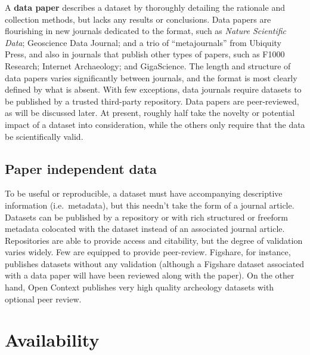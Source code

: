\documentclass[10pt,a4paper,twocolumn]{article}
\begin{document}
A \textbf{data paper} describes a dataset by thoroughly detailing the rationale and collection methods, but lacks any results or conclusions. 
Data papers are flourishing in new journals dedicated to the format, such as \emph{Nature Scientific Data}\cite{nature_scientific_data}; Geoscience Data Journal\cite{geoscience_data_journal}; and a trio of ``metajournals'' from Ubiquity Press\cite{ubiquity_press_metajournals}, and also in journals that publish other types of papers, such as F1000 Research\cite{f1000_research}; Internet Archaeology\cite{internet_archaeology}; and GigaScience\cite{gigascience}. 
The length and structure of data papers varies significantly between journals, and the format is most clearly defined by what is absent.
With few exceptions, data journals require datasets to be published by a trusted third-party repository. 
Data papers are peer-reviewed, as will be discussed later.  At present, roughly half take the novelty or potential impact of a dataset into consideration, while the others only require that the data be scientifically valid.

\subsection*{Paper independent data}\label{paper-independent-data}

To be useful or reproducible, a dataset must have accompanying descriptive information (i.e.~metadata), but this needn't take the form of a journal article. 
Datasets can be published by a repository or with rich structured or freeform metadata colocated with the dataset instead of an associated journal article. Repositories are able to provide access and citability, but the degree of validation varies widely. 
Few are equipped to provide peer-review. Figshare\cite{figshare}, for instance, publishes datasets without any validation (although a Figshare dataset associated with a data paper will have been reviewed along with the paper). 
On the other hand, Open Context\cite{open_context} publishes very high quality archeology datasets with optional peer review.


\section*{Availability}\label{availability}
\end{document}

